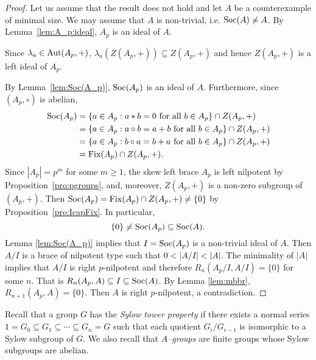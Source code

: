 \begin{proof}
    Let us assume that the result does not hold and let $A$ be a counterexample of minimal size. We may assume that $A$ is non-trivial, i.e. $\operatorname{Soc}(A)\ne A$.
    By Lemma~\ref{lem:A_p:ideal}, $A_p$ is an ideal of $A$.
    
    Since 
    $\lambda_a\in\operatorname{Aut}(A_p,+)$, $\lambda_a(Z(A_p,+))\subseteq Z(A_p,+)$ 
    and hence $Z(A_p,+)$ is a left ideal of $A_p$.
    
    By Lemma~\ref{lem:Soc(A_p)}, $\operatorname{Soc}(A_p)$ is an ideal of $A$. Furthermore, since $(A_p,\circ)$ is abelian, 
    \begin{align*}
    \operatorname{Soc}(A_p)&=\{a\in A_p:a*b=0\text{ for all $b\in A_p$}\}\cap Z(A_p,+)\\
    &=\{a\in A_p:a\circ b=a+b\text{ for all $b\in A_p$}\}\cap Z(A_p,+)\\
    &=\{a\in A_p:b\circ a=b+a\text{ for all $b\in A_p$}\}\cap Z(A_p,+)\\
    &=\operatorname{Fix}(A_p)\cap Z(A_p,+).
    \end{align*}
    Since $|A_p|=p^m$ for some $m\geq1$, the skew left brace $A_p$ is left nilpotent by Proposition~\ref{pro:pgroups}, and, moreover, $Z(A_p,+)$ is a non-zero 
    subgroup of $(A_p,+)$. Then $\operatorname{Soc}(A_p)=\operatorname{Fix}(A_p)\cap Z(A_p,+)\ne\{0\}$ by
    Proposition~\ref{pro:IcapFix}. 
    In particular, 
    \[
    \{0\}\ne \operatorname{Soc}(A_p)\subseteq \operatorname{Soc}(A).
    \]
    Lemma \ref{lem:Soc(A_p)} implies that $I=\operatorname{Soc}(A_p)$ is a non-trivial ideal of $A$. Then $A/I$ is a brace of nilpotent type such that $0<|A/I|<|A|$. 
    The minimality of $|A|$ implies that $A/I$ is right $p$-nilpotent and 
    therefore $R_n(A_p/I,A/I)=\{0\}$ for some $n$. 
    That is $R_n(A_p,A)\subseteq I\subseteq \operatorname{Soc}(A)$. 
    By Lemma \ref{lem:mbbr}, $R_{n+1}(A_p,A)=\{0\}$. Then $A$ is right $p$-nilpotent, a contradiction.
\end{proof}

Recall that a
group $G$ has the \emph{Sylow tower property} if 
there exists a normal series
$1=G_0\subseteq G_1\subseteq\cdots\subseteq G_n=G$ 
such that each quotient $G_i/G_{i-1}$ is isomorphic to a Sylow subgroup of $G$. 
We also recall that \emph{$A$--groups} are finite groups whose Sylow subgroups are abelian. 

